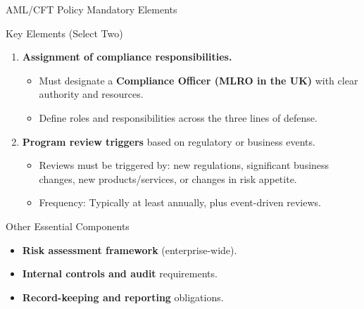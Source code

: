 \documentclass{beamer}
\begin{document}
	\begin{frame}{AML/CFT Policy Mandatory Elements}
		\begin{block}{Key Elements (Select Two)}
			\begin{enumerate}
				\item \textbf{Assignment of compliance responsibilities.}
				\begin{itemize}
					\item Must designate a \textbf{Compliance Officer (MLRO in the UK)} with clear authority and resources.
					\item Define roles and responsibilities across the three lines of defense.
				\end{itemize}
				\item \textbf{Program review triggers} based on regulatory or business events.
				\begin{itemize}
					\item Reviews must be triggered by: new regulations, significant business changes, new products/services, or changes in risk appetite.
					\item Frequency: Typically at least annually, plus event-driven reviews.
				\end{itemize}
			\end{enumerate}
		\end{block}
		\begin{block}{Other Essential Components}
			\begin{itemize}
				\item \textbf{Risk assessment framework} (enterprise-wide).
				\item \textbf{Internal controls and audit} requirements.
				\item \textbf{Record-keeping and reporting} obligations.
			\end{itemize}
		\end{block}
	\end{frame}
	
\end{document}
